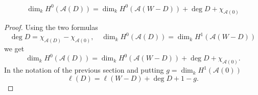 \begin{theorem}\label{thm:riemann-roch-adèle}
	\[
		\dim_{k} H^{0}(\mathcal{A}(D)) = \dim_{k}H^{0}(\mathcal{A}(W - D)) + \deg D + \chi_{\mathcal{A}(0)}
	\]
\end{theorem}
\begin{proof}
	Using the two formulas
	\[
		\deg D = \chi_{\mathcal{A}(D)} - \chi_{\mathcal{A}(0)}, \quad \dim_{k}H^{0}(\mathcal{A}(D)) = \dim_{k}H^{1}(\mathcal{A}(W - D))
	\]
	we get
	\[
		\dim_{k}H^{0}(\mathcal{A}(D)) = \dim_{k}H^{0}(\mathcal{A}(W - D)) + \deg D + \chi_{\mathcal{A}(0)}. 
	\]
	In the notation of the previous section and putting $g = \dim_{k}H^{1}(\mathcal{A}(0))$
	\[
		\ell(D) = \ell(W - D) + \deg D + 1 - g.
	\]
\end{proof} 
